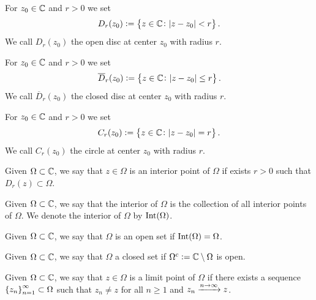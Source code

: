 \documentclass[11pt,a4paper]{article}
\begin{document}
\begin{definition}
  For $z_0 \in \mathbb{C}$ and $r > 0$ we set
  \[
      D_r(z_0) := \left\{z \in \mathbb{C} \colon |z - z_0| < r\right\}.
  \]
  We call $D_r(z_0)$ the open disc at center $z_0$ with radius $r$.
\end{definition}


\begin{definition}
  For $z_0 \in \mathbb{C}$ and $r > 0$ we set
  \[
      \overline D_r(z_0) := \left\{z \in \mathbb{C} \colon |z - z_0| \le r\right\}.
  \]
  We call $\overline D_r(z_0)$ the closed disc at center $z_0$ with
  radius $r$.
\end{definition}

\begin{definition}[Circle]
  For $z_0 \in \mathbb{C}$ and $r > 0$ we set
  \[
      C_r(z_0) := \left\{z \in \mathbb{C} \colon |z - z_0| = r\right\}.
  \]
  We call $C_r(z_0)$ the circle at center $z_0$ with radius $r$.
\end{definition}

\begin{definition}
  Given $\Omega \subset \mathbb{C}$, we say that $z \in \Omega$ is an interior
  point of $\Omega$ if exists $r > 0$ such that $D_r(z) \subset \Omega$.
\end{definition}

\begin{definition}
  Given $\Omega \subset \mathbb{C}$, we say that the interior of $\Omega$ is
  the collection of all interior points of $\Omega$.
  We denote the interior of $\Omega$ by $\operatorname{Int}(\Omega)$.
\end{definition}

\begin{definition}
  Given $\Omega \subset \mathbb{C}$, we say that $\Omega$ is an open set if
  $\operatorname{Int}(\Omega) = \Omega$.
\end{definition}

\begin{definition}
  Given $\Omega \subset \mathbb{C}$, we say that $\Omega$ a closed set if
  $\Omega^c := \mathbb{C} \setminus \Omega$ is open.
\end{definition}

\begin{definition}
  Given $\Omega \subset \mathbb{C}$, we say that $z \in \Omega$ is a limit
  point of $\Omega$ if there exists a sequence
  $\left\{z_n\right\}_{n=1}^{\infty} \subset \Omega$ such that
  $z_n \neq z$ for all $n \geq 1$ and $z_n \xrightarrow{n \to \infty} z$.
\end{definition}
\end{document}
